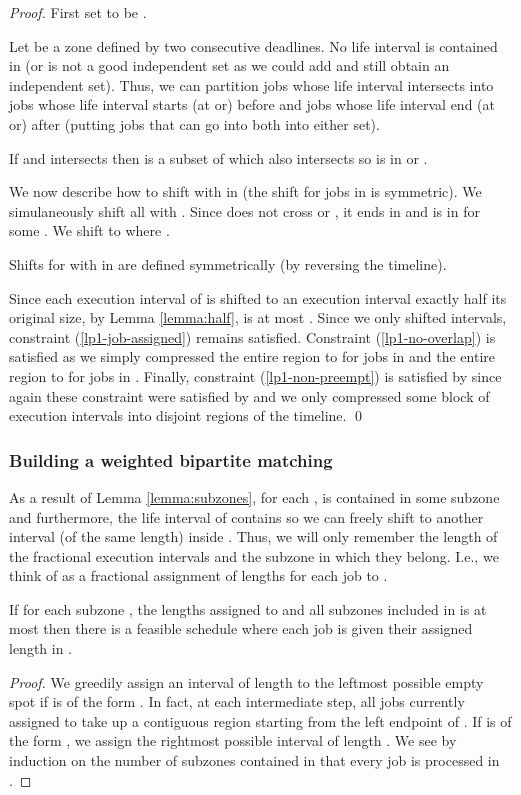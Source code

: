 \begin{proof}
  First set  to be .

  Let  be a zone defined by two consecutive deadlines. No life interval  is contained in  (or  is not a good independent set as we could add  and still obtain an independent set). Thus, we can partition jobs whose life interval intersects  into jobs  whose life interval starts (at or) before  and jobs  whose life interval end (at or) after  (putting jobs that can go into both into either set).

  If  and  intersects  then  is a subset of  which also intersects  so  is in  or .

  We now describe how to shift  with  in  (the shift for jobs in  is symmetric). We simulaneously shift all  with . Since  does not cross  or , it ends in  and  is in  for some . We shift  to  where .

  Shifts for  with  in  are defined symmetrically (by reversing the timeline).

  Since each execution interval of  is shifted to an execution interval exactly half its original size, by Lemma \ref{lemma:half},  is at most .
  Since we only shifted intervals, constraint (\ref{lp1-job-assigned}) remains satisfied. Constraint (\ref{lp1-no-overlap}) is satisfied as we simply compressed the entire region  to  for jobs in  and the entire region  to  for jobs in . Finally, constraint (\ref{lp1-non-preempt}) is satisfied by  since again these constraint were satisfied by  and we only compressed some block of execution intervals into disjoint regions of the timeline.
\qed\end{proof}

\subsubsection{Building a weighted bipartite matching}

As a result of Lemma \ref{lemma:subzones}, for each ,  is contained in some subzone  and furthermore, the life interval of  contains  so we can freely shift  to another interval (of the same length) inside .
Thus, we will only remember the length of the fractional execution intervals and the subzone  in which they belong. I.e., we think of  as a fractional assignment of lengths  for each job to .

\begin{lem}\label{lemma:earliest_deadline_first}
  If for each subzone , the lengths  assigned to  and all subzones included in  is at most  then there is a feasible schedule where each job is given their assigned length in .
\end{lem}
\begin{proof}
We greedily assign  an interval of length  to the leftmost possible empty spot if  is of the form . In fact, at each intermediate step, all jobs currently assigned to  take up a contiguous region starting from the left endpoint  of . If  is of the form , we assign  the rightmost possible interval of length .
We see by induction on the number of subzones contained in  that every job is processed in .
\end{proof}



